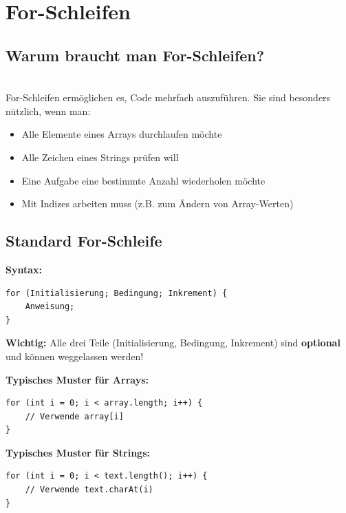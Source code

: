 \newpage


\section*{For-Schleifen}

\subsection*{Warum braucht man For-Schleifen?}\\
For-Schleifen ermöglichen es, Code mehrfach auszuführen. Sie sind besonders nützlich, wenn man:
\begin{itemize}
	\item Alle Elemente eines Arrays durchlaufen möchte
	\item Alle Zeichen eines Strings prüfen will
	\item Eine Aufgabe eine bestimmte Anzahl wiederholen möchte
	\item Mit Indizes arbeiten muss (z.B. zum Ändern von Array-Werten)
\end{itemize}

\newpage


\subsection*{Standard For-Schleife}

\textbf{Syntax:}
\begin{lstlisting}
for (Initialisierung; Bedingung; Inkrement) {
    Anweisung;
}
\end{lstlisting}

\textbf{Wichtig:} Alle drei Teile (Initialisierung, Bedingung, Inkrement) sind \textbf{optional} und können weggelassen werden!

\textbf{Typisches Muster für Arrays:}
\begin{lstlisting}
for (int i = 0; i < array.length; i++) {
    // Verwende array[i]
}
\end{lstlisting}

\textbf{Typisches Muster für Strings:}
\begin{lstlisting}
for (int i = 0; i < text.length(); i++) {
    // Verwende text.charAt(i)
}
\end{lstlisting}

